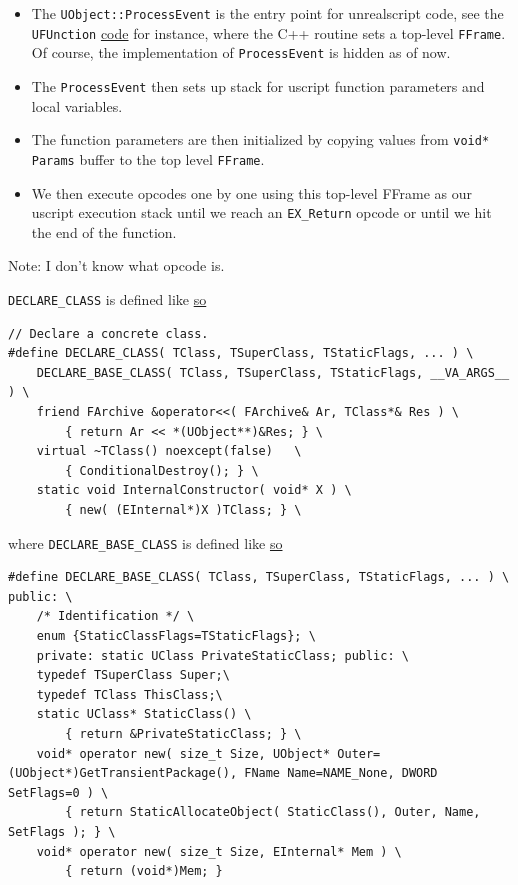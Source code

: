 \documentclass{article}
\theoremstyle{definition}
\begin{document}
\begin{itemize}
\item The \texttt{UObject::ProcessEvent} is the entry point for unrealscript code, see the \texttt{UFUnction} \href{https://github.com/ravimohan1991/ChatDiamond/blob/5592fef2b13305e441c1dd2b09dde7dd52ff2d83/UTNativeEssentials/Core/Inc/UnClass.h#L379}{code} for instance, where the C++ routine sets a top-level 
\texttt{FFrame}.  Of course, the implementation of \texttt{ProcessEvent} is hidden as of now.
\item The \texttt{ProcessEvent} then sets up stack for uscript function parameters and local variables.
\item The function parameters are then initialized by copying values from \texttt{void* Params} buffer to the top level
 \texttt{FFrame}.
\item  We then execute opcodes one by one using this top-level FFrame as our uscript execution stack until we reach an \texttt{EX\_Return}
opcode or until we hit the end of the function.
\end{itemize}

Note: I don't know what opcode is.

\texttt{DECLARE\_CLASS} is defined like \href{https://github.com/ravimohan1991/ChatDiamond/blob/5592fef2b13305e441c1dd2b09dde7dd52ff2d83/UTNativeEssentials/Core/Inc/UnObjBas.h#L421}{so}

\lstset{language=C++}
\begin{lstlisting}[frame=single]
// Declare a concrete class.
#define DECLARE_CLASS( TClass, TSuperClass, TStaticFlags, ... ) \
	DECLARE_BASE_CLASS( TClass, TSuperClass, TStaticFlags, __VA_ARGS__ ) \
	friend FArchive &operator<<( FArchive& Ar, TClass*& Res ) \
		{ return Ar << *(UObject**)&Res; } \
	virtual ~TClass() noexcept(false)   \
		{ ConditionalDestroy(); } \
	static void InternalConstructor( void* X ) \
		{ new( (EInternal*)X )TClass; } \
\end{lstlisting}

where \texttt{DECLARE\_BASE\_CLASS} is defined like \href{https://github.com/ravimohan1991/ChatDiamond/blob/5592fef2b13305e441c1dd2b09dde7dd52ff2d83/UTNativeEssentials/Core/Inc/UnObjBas.h#L380}{so}

\lstset{language=C++}
\begin{lstlisting}[frame=single]
#define DECLARE_BASE_CLASS( TClass, TSuperClass, TStaticFlags, ... ) \
public: \
	/* Identification */ \
	enum {StaticClassFlags=TStaticFlags}; \
	private: static UClass PrivateStaticClass; public: \
	typedef TSuperClass Super;\
	typedef TClass ThisClass;\
	static UClass* StaticClass() \
		{ return &PrivateStaticClass; } \
	void* operator new( size_t Size, UObject* Outer=(UObject*)GetTransientPackage(), FName Name=NAME_None, DWORD SetFlags=0 ) \
		{ return StaticAllocateObject( StaticClass(), Outer, Name, SetFlags ); } \
	void* operator new( size_t Size, EInternal* Mem ) \
		{ return (void*)Mem; }
\end{lstlisting}
\end{document}
